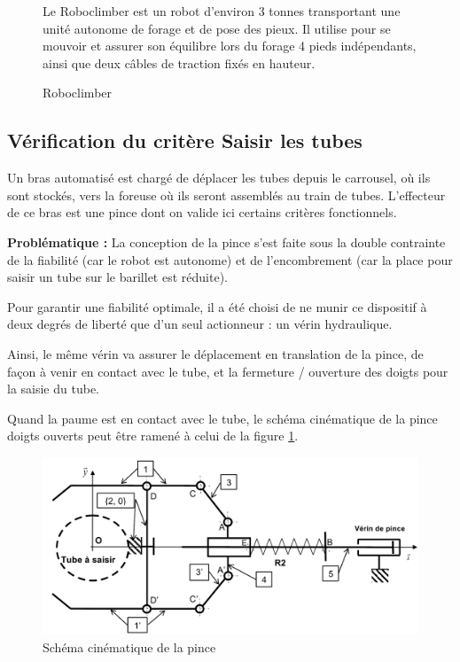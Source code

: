 \begin{figure}[!h]
\begin{minipage}{0.49\linewidth}
\begin{flushleft}
   Le Roboclimber est un robot d'environ 3 tonnes transportant une unité autonome de forage et de pose des pieux. Il utilise pour se mouvoir et assurer son équilibre lors du forage 4 pieds indépendants, ainsi que deux câbles de traction fixés en hauteur.\end{flushleft}
  \end{minipage}
  \caption{Roboclimber}
\end{figure}

\subsection{Vérification du critère \og Saisir les tubes \fg}

Un bras automatisé est chargé de déplacer les tubes depuis le carrousel, où ils sont stockés, vers la foreuse où ils seront assemblés au train de tubes. L'effecteur de ce bras est une pince dont on valide ici certains critères fonctionnels.

\textbf{Problématique :} La conception de la pince s'est faite sous la double contrainte de la fiabilité (car le robot est autonome) et de l'encombrement (car la place pour saisir un tube sur le barillet est réduite).

Pour garantir une fiabilité optimale, il a été choisi de ne munir ce dispositif à deux degrés de liberté que d'un seul actionneur : un vérin hydraulique.

Ainsi, le même vérin va assurer le déplacement en translation de la pince, de façon à venir en contact avec le tube, et la fermeture / ouverture des doigts pour la saisie du tube.

Quand la paume est en contact avec le tube, le schéma cinématique de la pince \og doigts ouverts \fg peut être ramené à celui de la figure \ref{roboclimber_cin}.

\newpage

\begin{figure}[h!]
 \centering\includegraphics[width=0.9\linewidth]{img/pince_robo_cin.png}
 \caption{Schéma cinématique de la pince}
 \label{roboclimber_cin}
\end{figure}

